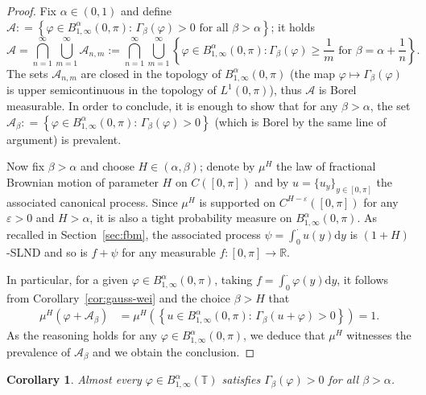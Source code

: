 \documentclass[11pt,oneside,reqno]{amsart}
\newcommand{\assign}{:=}
\newcommand{\mathd}{\mathrm{d}}
\newtheorem{corollary}[theorem]{Corollary}
\numberwithin{equation}{section}
\begin{document}
\begin{proof}
  Fix $\alpha \in (0, 1)$ and define $\mathcal{A} : = \left\{ \varphi \in
  B^{\alpha}_{1, \infty} (0, \pi) : \, \Gamma_{\beta} (\varphi) > 0 \text{ for
  all } \beta > \alpha \right\}$; it holds
  \[ \mathcal{A} = \bigcap_{n = 1}^{\infty} \bigcup_{m = 1}^{\infty}
     \mathcal{A}_{n, m} \assign \bigcap_{n = 1}^{\infty} \bigcup_{m =
     1}^{\infty} \left\{ \varphi \in B^{\alpha}_{1, \infty} (0, \pi) :
     \Gamma_{\beta} (\varphi) \geqslant \frac{1}{m} \text{ for } \beta =
     \alpha + \frac{1}{n} \right\} . \]
  The sets $\mathcal{A}_{n, m}$ are closed in the topology of $B^{\alpha}_{1,
  \infty} (0, \pi)$ (the map $\varphi \mapsto \Gamma_{\beta} (\varphi)$ is
  upper semicontinuous in the topology of $L^1 (0, \pi)$), thus $\mathcal{A}$
  is Borel measurable. In order to conclude, it is enough to show that for any
  $\beta > \alpha$, the set $\mathcal{A}_{\beta} : = \left\{ \varphi \in
  B^{\alpha}_{1, \infty} (0, \pi) : \, \Gamma_{\beta} (\varphi) > 0 \right\}$
  (which is Borel by the same line of argument) is prevalent.
  
  Now fix $\beta > \alpha$ and choose $H \in (\alpha, \beta)$; denote by
  $\mu^H$ the law of fractional Brownian motion of parameter $H$ on $C ([0,
  \pi])$ and by $u = \{ u_y \}_{y \in [0, \pi]}$ the associated canonical
  process. Since $\mu^H$ is supported on $C^{H - \varepsilon} ([0, \pi])$ for
  any $\varepsilon > 0$ and $H > \alpha$, it is also a tight probability
  measure on $B^{\alpha}_{1, \infty} (0, \pi)$. As recalled in
  Section~\ref{sec:fbm}, the associated process $\psi = \int_0^{\cdot} u (y)
  \mathd y$ is $(1 + H)$-SLND and so is $f + \psi$ for any measurable $f : [0,
  \pi] \rightarrow \mathbb{R}$.
  
  In particular, for a given $\varphi \in B^{\alpha}_{1, \infty} (0, \pi)$,
  taking $f = \int_0^{\cdot} \varphi (y) \mathd y$, it follows from
  Corollary~\ref{cor:gauss-wei} and the choice $\beta > H$ that
%  
  \begin{align*}
    \mu^H (\varphi + \mathcal{A}_{\beta}) & = \mu^H \left( \left\{ u \in
    B^{\alpha}_{1, \infty} (0, \pi) : \, \Gamma_{\beta} (u + \varphi) > 0
    \right\} \right) = 1.
  \end{align*}
%  
  As the reasoning holds for any $\varphi \in B^{\alpha}_{1, \infty} (0,
  \pi)$, we deduce that $\mu^H$ witnesses the prevalence of
  $\mathcal{A}_{\beta}$ and we obtain the conclusion.
\end{proof}

\begin{corollary}
  \label{cor:prevalence-periodic-wei}Almost every $\varphi \in B^{\alpha}_{1,
  \infty} (\mathbb{T})$ satisfies $\Gamma_{\beta} (\varphi) > 0$ for all
  $\beta > \alpha$.
\end{corollary}
\end{document}
